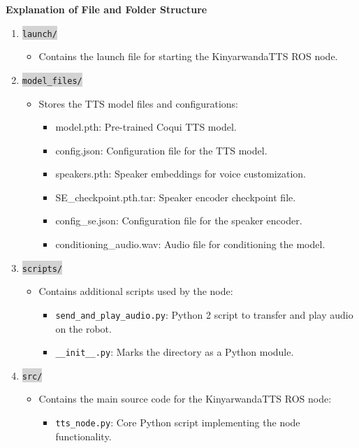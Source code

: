 \documentclass{CSSRforAfrica}
\begin{document}
\textbf{Explanation of File and Folder Structure}
\begin{enumerate}

    \item \colorbox{lightgray}{\texttt{launch/}}
    \begin{itemize}
        \item Contains the launch file for starting the KinyarwandaTTS ROS node.
    \end{itemize}
    
    \item \colorbox{lightgray}{\texttt{model\_files/}}
    \begin{itemize}
        \item Stores the TTS model files and configurations:
        \begin{itemize}
            \item model.pth: Pre-trained Coqui TTS model.
            \item config.json: Configuration file for the TTS model.
            \item speakers.pth: Speaker embeddings for voice customization.
            \item SE\_checkpoint.pth.tar: Speaker encoder checkpoint file.
            \item config\_se.json: Configuration file for the speaker encoder.
            \item conditioning\_audio.wav: Audio file for conditioning the model.
        \end{itemize}
    \end{itemize}

\newpage
    \item \colorbox{lightgray}{\texttt{scripts/}}
    \begin{itemize}
        \item Contains additional scripts used by the node:
        \begin{itemize}
            \item \texttt{send\_and\_play\_audio.py}: Python 2 script to transfer and play audio on the robot.
            \item \texttt{\_\_init\_\_.py}: Marks the directory as a Python module.
        \end{itemize}
    \end{itemize}
    
    \item \colorbox{lightgray}{\texttt{src/}}
    \begin{itemize}
        \item Contains the main source code for the KinyarwandaTTS ROS node:
        \begin{itemize}
            \item \texttt{tts\_node.py}: Core Python script implementing the node functionality.
        \end{itemize}
    \end{itemize}
    

\end{enumerate}
\end{document}
